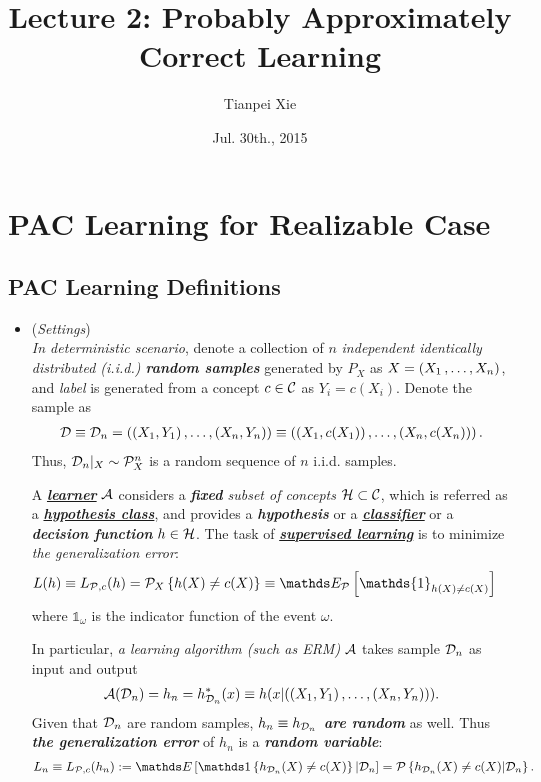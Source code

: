 \documentclass[11pt]{article}
\begin{document}
\title{Lecture 2: Probably Approximately Correct Learning}
\author{ Tianpei Xie}
\date{ Jul. 30th., 2015 }
\maketitle
\tableofcontents
\newpage
\section{PAC Learning for Realizable Case}
\subsection{PAC Learning Definitions}
\begin{itemize}
\item \begin{remark} (\emph{Settings}) \\
\emph{In deterministic scenario}, denote a collection of $n$ \emph{independent identically distributed (i.i.d.) \textbf{random samples}} generated by $P_X$ as $X = \left(X_1 \,{,}\ldots{,}\, X_n\right)$, and \emph{label} is generated from a concept $c \in {\mathcal C}$ as $Y_i = c(X_i)$. Denote the sample as 
\begin{align*}
{\mathcal D} \equiv {\mathcal D}_n = \left((X_1, Y_1) \,{,}\ldots{,}\, (X_n, Y_n)\right) \equiv  \left((X_1, c(X_1)) \,{,}\ldots{,}\, (X_n, c(X_n))\right) .
\end{align*} Thus, ${\mathcal D}_n|_{X} \sim {\mathcal P}_X^n$ is a random sequence of $n$ i.i.d. samples.

A \underline{\emph{\textbf{learner}}} ${\mathcal A}$  considers a \emph{\textbf{fixed} subset of concepts}  ${\mathcal H}\subset {\mathcal C}$, which is referred as a \underline{\emph{\textbf{hypothesis class}}}, and provides a \emph{\textbf{hypothesis}} or a \underline{\emph{\textbf{classifier}}} or a \emph{\textbf{decision function}} $h\in {\mathcal H}$. The task of \underline{\emph{\textbf{supervised learning}}} is to minimize \emph{the generalization error}:
\begin{align*}
L(h) \equiv L_{\cP, c}(h) &= \cP_{X}\set{h(X) \neq c(X)} \equiv \E{\cP}{\mathds{1}_{h(X)\neq c(X)}}
\end{align*} where $\mathds{1}_{\omega}$ is the indicator function of the event $\omega$. 

In particular, \emph{a learning algorithm (such as ERM)} ${\mathcal A}$ takes sample ${\mathcal D}_n$ as input and output 
\begin{align*}
{\mathcal A}({\mathcal D}_n) = h_n =  h_{{\mathcal D}_n}^{*}(x)  \equiv  h(x | ((X_1, Y_1) \,{,}\ldots{,}\, (X_n, Y_n)) ).
\end{align*}  Given that ${\mathcal D}_n$ are random samples, \emph{\textbf{$h_n \equiv h_{{\mathcal D}_n}$ are random}} as well. Thus \emph{\textbf{the generalization error}} of $h_n$ is a \emph{\textbf{random variable}}: 
\begin{align*}
L_n \equiv L_{\cP, c}(h_n) := \E{}{ \ind{h_{\cD_n}(X) \neq c(X)}| \cD_n} = \cP\set{h_{\cD_n}(X) \neq c(X) | \cD_n}.
\end{align*}
\end{remark}



\end{itemize}
\end{document}
